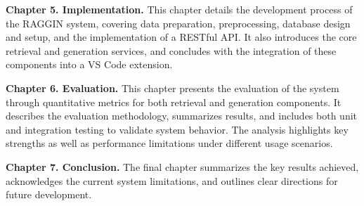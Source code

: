 \textbf{Chapter 5. Implementation.} 
This chapter details the development process of the RAGGIN system, covering data preparation, preprocessing, database design and setup, and the implementation of a RESTful API. It also introduces the core retrieval and generation services, and concludes with the integration of these components into a VS Code extension.

\textbf{Chapter 6. Evaluation.}
This chapter presents the evaluation of the system through quantitative metrics for both retrieval and generation components. It describes the evaluation methodology, summarizes results, and includes both unit and integration testing to validate system behavior. The analysis highlights key strengths as well as performance limitations under different usage scenarios.

\textbf{Chapter 7. Conclusion.}
The final chapter summarizes the key results achieved, acknowledges the current system limitations, and outlines clear directions for future development.


